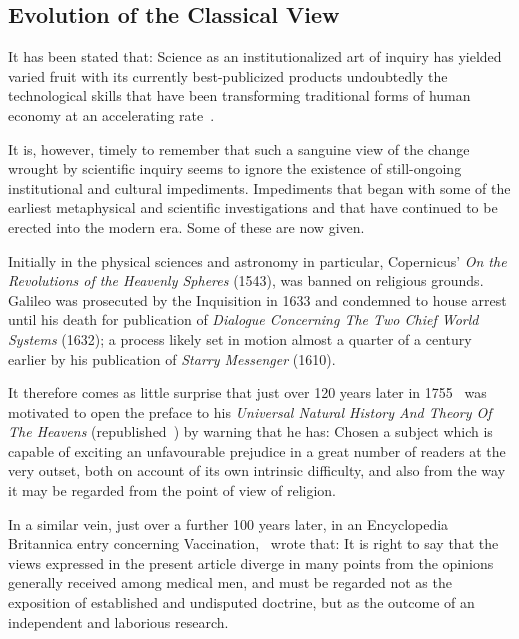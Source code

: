 \documentclass[11pt,3p,twocolumn]{JMN}
\begin{document}

\subsection{Evolution of the Classical View}

It has been stated that: Science as an institutionalized art of inquiry has yielded varied fruit with its currently best-publicized products undoubtedly the technological skills that have been transforming traditional forms of human economy at an accelerating rate~\citep{nagel61}.

It is, however, timely to remember that such a sanguine view of the change wrought by scientific inquiry seems to ignore the existence of still-ongoing  institutional and cultural impediments. Impediments that began with some of the earliest metaphysical and scientific investigations and that have continued to be erected into the modern era. Some of these are now given.

Initially in the physical sciences and astronomy in particular, Copernicus' {\it{On the Revolutions of the Heavenly Spheres}} (1543), was banned on religious grounds. Galileo was prosecuted by the Inquisition in 1633 and condemned to house arrest until his death for publication of {\it{Dialogue Concerning The Two Chief World Systems}} (1632); a process likely set in motion almost a quarter of a century earlier by his publication of {\it{Starry Messenger}} (1610).

It therefore comes as little surprise that just over 120 years later in 1755~\citeauthor{kant08} was motivated to open the preface to his {\it{Universal Natural History And Theory Of The Heavens}} (republished~\citeyear{kant08}) by warning that he has: Chosen a subject which is capable of exciting an unfavourable prejudice in a great number of readers at the very outset, both on account of its own intrinsic difficulty, and also from the way it may be regarded from the point of view of religion.
 
In a similar vein, just over a further 100 years later, in an Encyclopedia Britannica entry concerning Vaccination,~\citet{creighton88} wrote that: It is right to say that the views expressed in the present article diverge in many points from the opinions generally received among medical men, and must be regarded not as the exposition of established and undisputed doctrine, but as the outcome of an independent and laborious research.
\end{document}
